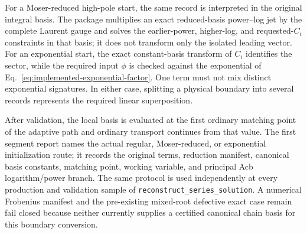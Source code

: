 \documentclass[11pt]{article}
\begin{document}
For a Moser-reduced high-pole start, the same record is interpreted in the original integral
basis.  The package multiplies an exact reduced-basis power--log jet by the complete Laurent
gauge and solves the earlier-power, higher-log, and requested-$C_i$ constraints in that basis;
it does not transform only the isolated leading vector.  For an exponential start, the exact
constant-basis transform of $C_i$ identifies the sector, while the required input $\phi$ is
checked against the exponential of Eq.~\eqref{eq:implemented-exponential-factor}.  One term
must not mix distinct
exponential signatures.  In either case, splitting a physical boundary into several records
represents the required linear superposition.

After validation, the local basis is evaluated at the first ordinary matching point of the
adaptive path and ordinary transport continues from that value.  The first segment report
names the actual regular, Moser-reduced, or exponential initialization route; it records the
original terms, reduction manifest, canonical basis constants, matching point, working
variable, and principal Acb
logarithm/power branch.  The same protocol is used independently at every production
and validation sample of \texttt{reconstruct\_series\_solution}.  A numerical Frobenius
manifest and the pre-existing mixed-root defective exact case remain fail closed because
neither currently supplies a certified canonical chain basis for this boundary conversion.
\end{document}
